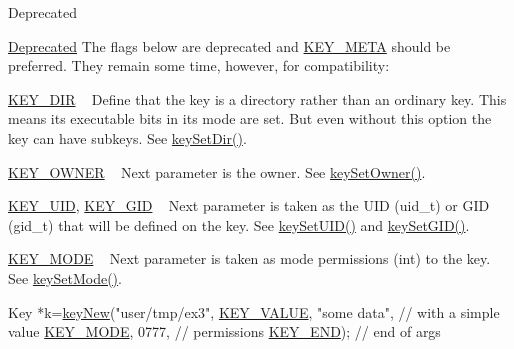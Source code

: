 \begin{DoxyRefDesc}{Deprecated}
\item[\hyperlink{deprecated__deprecated000010}{Deprecated}]The flags below are deprecated and \hyperlink{group__key_gga9b703ca49f48b482def322b77d3e6bc8a040582834bb2d90049947d7ef74e87e2}{K\+E\+Y\+\_\+\+M\+E\+TA} should be preferred. They remain some time, however, for compatibility\+:
\begin{DoxyItemize}
\item \hyperlink{group__key_gga9b703ca49f48b482def322b77d3e6bc8a9e43e47c8a21478538e2d20e049981d5}{K\+E\+Y\+\_\+\+D\+IR} ~\newline
 Define that the key is a directory rather than an ordinary key. This means its executable bits in its mode are set. But even without this option the key can have subkeys. See \hyperlink{group__meta_gaae575bd86a628a15ee45baa860522e75}{key\+Set\+Dir()}.
\item \hyperlink{group__key_gga9b703ca49f48b482def322b77d3e6bc8a77ca60362fa8daca8d5347db4385068b}{K\+E\+Y\+\_\+\+O\+W\+N\+ER} ~\newline
 Next parameter is the owner. See \hyperlink{owner_8c_a88d6ec200ba0707b7c1b4a88133d2be4}{key\+Set\+Owner()}.
\item \hyperlink{group__key_gga9b703ca49f48b482def322b77d3e6bc8a28f01a87d65f065172f734c9c9446c0e}{K\+E\+Y\+\_\+\+U\+ID}, \hyperlink{group__key_gga9b703ca49f48b482def322b77d3e6bc8ac0628bbaba7c837ca73323681393d15f}{K\+E\+Y\+\_\+\+G\+ID} ~\newline
 Next parameter is taken as the U\+ID (uid\+\_\+t) or G\+ID (gid\+\_\+t) that will be defined on the key. See \hyperlink{group__meta_gab5f284f5ecd261e0a290095f50ba1af7}{key\+Set\+U\+I\+D()} and \hyperlink{group__meta_ga9e3d0fb3f7ba906e067727b9155d22e3}{key\+Set\+G\+I\+D()}.
\item \hyperlink{group__key_gga9b703ca49f48b482def322b77d3e6bc8a1b0a91ff3a855d6993930ebf0abaa518}{K\+E\+Y\+\_\+\+M\+O\+DE} ~\newline
 Next parameter is taken as mode permissions (int) to the key. See \hyperlink{group__meta_ga8803037e35b9da1ce492323a88ff6bc3}{key\+Set\+Mode()}. 
\begin{DoxyCodeInclude}
Key *k=\hyperlink{group__key_gad23c65b44bf48d773759e1f9a4d43b89}{keyNew}(\textcolor{stringliteral}{"user/tmp/ex3"},
        \hyperlink{group__key_gga9b703ca49f48b482def322b77d3e6bc8ac66e4a49d09212b79f5754ca6db5bd2e}{KEY\_VALUE}, \textcolor{stringliteral}{"some data"},    \textcolor{comment}{// with a simple value}
        \hyperlink{group__key_gga9b703ca49f48b482def322b77d3e6bc8a1b0a91ff3a855d6993930ebf0abaa518}{KEY\_MODE}, 0777,            \textcolor{comment}{// permissions}
        \hyperlink{group__key_gga9b703ca49f48b482def322b77d3e6bc8aa8adb6fcb92dec58fb19410eacfdd403}{KEY\_END});                  \textcolor{comment}{// end of args}
\end{DoxyCodeInclude}


\end{DoxyItemize}
\end{DoxyRefDesc}
